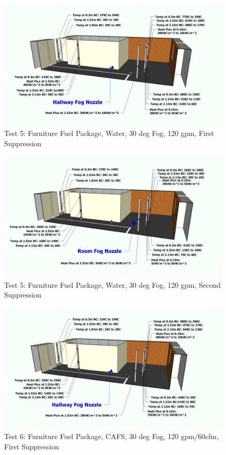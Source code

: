 \documentclass[12pt,oneside]{book}
\begin{document}
\begin{figure}[!ht]
	\includegraphics[width=6in]{../Figures/Pictures/Metric/DelCoFogTest5FirstSuppression}
	\caption{Test 5: Furniture Fuel Package, Water, 30 deg Fog, 120 gpm, First Suppression}
	\label{fig:Test_5_First_Suppression}
\end{figure}

\begin{figure}[!ht]
	\includegraphics[width=6in]{../Figures/Pictures/Metric/DelCoFogTest5SecondSuppression}
	\caption{Test 5: Furniture Fuel Package, Water, 30 deg Fog, 120 gpm, Second Suppression}
	\label{fig:Test_5_Second_Suppression}
\end{figure}

\begin{figure}[!ht]
	\includegraphics[width=6in]{../Figures/Pictures/Metric/DelCoFogTest6FirstSuppression}
	\caption{Test 6: Furniture Fuel Package, CAFS, 30 deg Fog, 120 gpm/60cfm, First Suppression}
	\label{fig:Test_6_First_Suppression}
\end{figure}
\end{document}
